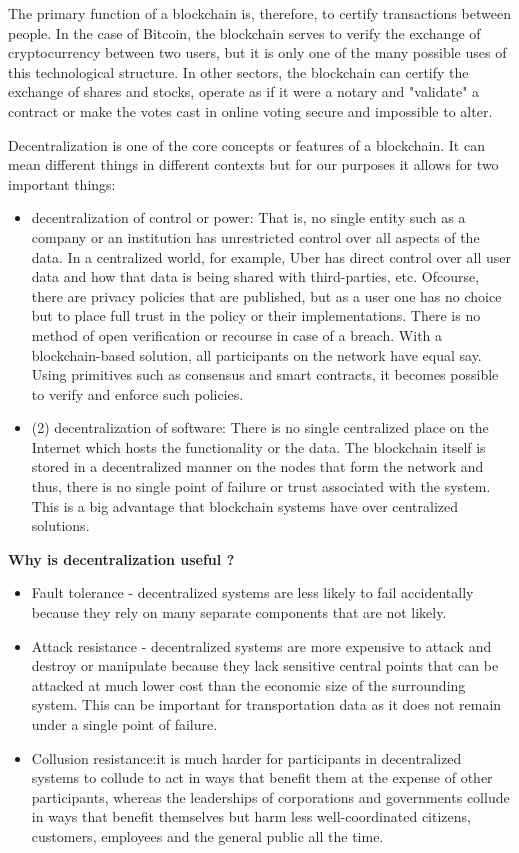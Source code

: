  The primary function of a blockchain is, therefore, to certify transactions between people. In the case of Bitcoin, the
 blockchain serves to verify the exchange of cryptocurrency between two users, but it is only one of the many possible
 uses of this technological structure. In other sectors, the blockchain can certify the exchange of shares and stocks,
 operate as if it were a notary and "validate" a contract or make the votes cast in online voting secure and impossible
 to alter.

Decentralization is one of the core concepts or features of a blockchain. It can mean different things in different
contexts but for our purposes it allows for two important things:
\begin{itemize}
    \item decentralization of control or power: That is, no single entity such as a company or an institution has
        unrestricted control over all aspects of the data. In a centralized world, for example, Uber has direct control
        over all user data and how that data is being shared with third-parties, etc. Ofcourse, there are privacy
        policies that are published, but as a user one has no choice but to place full trust in the policy or their
        implementations. There is no method of open verification or recourse in case of a breach. With a
        blockchain-based solution, all participants on the network have equal say. Using primitives such as consensus
        and smart contracts, it becomes possible to verify and enforce such policies.
    \item (2) decentralization of software: There is no single centralized place on the Internet which hosts the
        functionality or the data. The blockchain itself is stored in a decentralized manner on the nodes that form the
        network and thus, there is no single point of failure or trust associated with the system. This is a big
        advantage that blockchain systems have over centralized solutions.
\end{itemize}

\noindent
{\bf \textsf Why is decentralization useful ?}
\begin{itemize}

    \item Fault tolerance - decentralized systems are less likely to fail accidentally because they rely on many separate
components that are not likely.
    \item Attack resistance - decentralized systems are more expensive to attack and destroy or manipulate because they lack
sensitive central points that can be attacked at much lower cost than the economic size of the surrounding system. This
can be important for transportation data as it does not remain under a single point of failure.
    \item Collusion resistance:it is much harder for participants in decentralized systems to collude to act in ways that
benefit them at the expense of other participants, whereas the leaderships of corporations and governments collude in
ways that benefit themselves but harm less well-coordinated citizens, customers, employees and the general public all
the time.
\end{itemize}

